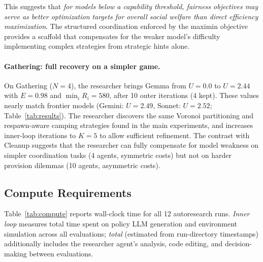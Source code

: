 \documentclass{article}
\begin{document}
This suggests that \emph{for models below a capability threshold, fairness objectives may serve as better optimization targets for overall social welfare than direct efficiency maximization}. The structured coordination enforced by the maximin objective provides a scaffold that compensates for the weaker model's difficulty implementing complex strategies from strategic hints alone.

\paragraph{Gathering: full recovery on a simpler game.}
On Gathering ($N{=}4$), the researcher brings Gemma from $U{=}0.0$ to $U{=}2.44$ with $E{=}0.98$ and $\min_i R_i{=}580$, after 10 outer iterations (4 kept). These values nearly match frontier models (Gemini: $U{=}2.49$, Sonnet: $U{=}2.52$; Table~\ref{tab:results}). The researcher discovers the same Voronoi partitioning and respawn-aware camping strategies found in the main experiments, and increases inner-loop iterations to $K{=}5$ to allow sufficient refinement. The contrast with Cleanup suggests that the researcher can fully compensate for model weakness on simpler coordination tasks (4 agents, symmetric costs) but not on harder provision dilemmas (10 agents, asymmetric costs).

\subsection{Compute Requirements}
\label{app:compute}

Table~\ref{tab:compute} reports wall-clock time for all 12 autoresearch runs. \emph{Inner loop} measures total time spent on policy LLM generation and environment simulation across all evaluations; \emph{total} (estimated from run-directory timestamps) additionally includes the researcher agent's analysis, code editing, and decision-making between evaluations.
\end{document}
